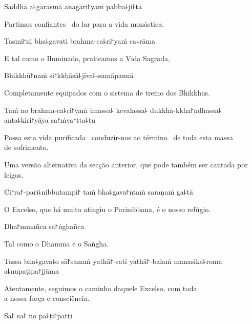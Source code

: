 Saddhā a꜕gārasmā anagāri꜓yaṁ pabba꜕ji꜕tā

\begin{english}
  Partimos confiantes \pause\ do lar para a vida monástica.
\end{english}

Tasmi꜓ṁ bha꜕gavati brahma-ca꜕ri꜓yaṁ ca꜕rāma

\begin{english}
  E tal como o Iluminado, praticamos a Vida Sagrada, 
\end{english}

Bhikkhū꜓naṁ si꜓kkhāsā꜕jīva꜕-samāpannā

\begin{english}
  Completamente equipados com o sistema de treino dos Bhikkhus.
\end{english}

\clearpage

Taṁ no brahma-ca꜕ri꜓yaṁ imassa꜕ kevalassa꜕ dukkha-kkha꜓ndhassa꜕ anta꜕kiri꜓yāya sa꜓ṁva꜓tta꜕tu

\begin{english}
  Possa esta vida purificada \pause\ conduzir-nos ao término \pause\ de toda esta massa\\ de sofrimento.
\end{english}

\begin{instruction}
  Uma versão alternativa da secção anterior, que pode também ser cantada por leigos.
\end{instruction}

Ci꜓ra꜓-pari꜕nibbutampi꜓ taṁ bha꜕gava꜓ntaṁ saraṇaṁ ga꜕tā

\begin{english}
  O Excelso, que há muito atingiu o Parinibbana, é o nosso refúgio.
\end{english}

Dha꜓mmañca sa꜓ṅghañca

\begin{english}
  Tal como o Dhamma e o Saṅgha.
\end{english}

Tassa bha꜕gavato sā꜓sanaṁ yathā꜓-sati yathā꜓-balaṁ manasika꜕roma a꜕nupaṭipa꜓jjāma

\begin{english}
  Atentamente, seguimos o caminho daquele Excelso, com toda\\ a nossa força e consciência.
\end{english}

Sā꜓ sā꜓ no pa꜕ṭi꜓patti

